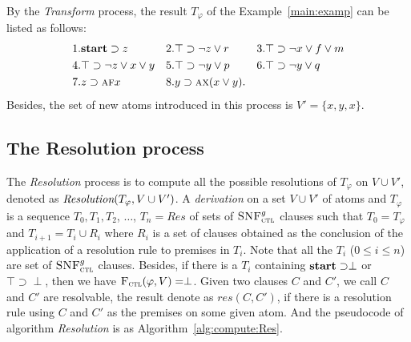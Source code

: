 \documentclass[letterpaper]{article} %
\begin{document}
\begin{example}\label{examp:Tran}
By the \emph{Transform} process, the result $T_{\varphi}$ of the Example~\ref{main:examp} can be listed as follows:
\begin{align*}
& 1. \textbf{start}\supset z && 2. \top \supset \neg z \vee r && 3.\top \supset \neg x\vee f \vee m\\
& 4. \top \supset \neg z \vee x \vee y && 5.\top \supset \neg y \vee p && 6.\top \supset \neg y \vee q\\
& 7. z \supset \textsc{a} \textsc{f} x && 8. y \supset \textsc{a} \textsc{x}(x\vee y).
\end{align*}
Besides, the set of new atoms introduced in this process is $V'=\{x, y,x\}$.
\end{example}




\subsection{The Resolution process}
The \emph{Resolution} process is to compute all the possible resolutions of $T_{\varphi}$ on $V\cup V'$, denoted as $\emph{Resolution}(T_{\varphi}, V\cup V')$.
A \emph{derivation} on a set $V\cup V'$ of atoms and $T_{\varphi}$ is a sequence $T_0, T_1, T_2$, $\dots$, $T_n=Res$ of sets of ${\textsc{SNF}_{\textsc{ctl}}^g}$ clauses such that $T_0 = T_{\varphi}$ and $T_{i+1} = T_i \cup R_i$ where $R_i$ is a set of clauses obtained as the conclusion of the application of a resolution rule to premises in $T_i$.
Note that all the $T_i$ ($0 \leq i \leq n$) are set of ${\textsc{SNF}_{\textsc{ctl}}^g}$ clauses.
Besides, if there is a $T_i$ containing $\textbf{start}\supset \perp$ or $\top\supset \perp$, then we have ${\textsc{F}_{\textsc{ctl}}}(\varphi, V)=\perp$.
Given two clauses $C$ and $C'$, we call $C$ and $C'$ are resolvable, the result denote as $res(C,C')$, if there is a resolution rule using $C$ and $C'$ as the premises on some given atom.
And the pseudocode of algorithm \emph{Resolution} is as Algorithm~\ref{alg:compute:Res}.
\end{document}

